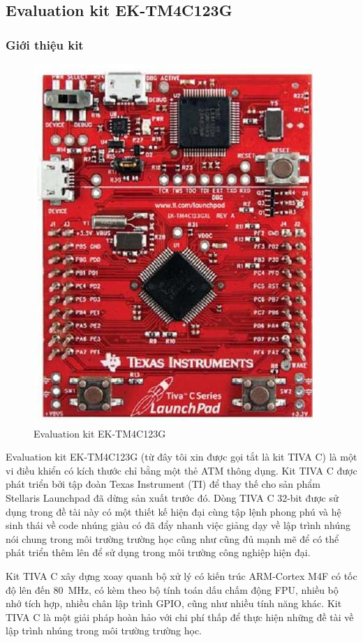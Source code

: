 \subsection{Evaluation kit EK-TM4C123G}
\subsubsection{Giới thiệu kit}
\begin{figure}[ht]
\centering
\includegraphics[scale=0.5]{images/kit_tivac.jpg}
\caption{Evaluation kit EK-TM4C123G}
\end{figure}

Evaluation kit EK-TM4C123G (từ đây tôi xin được gọi tắt là kit TIVA C) là một vi điều khiển có kích thước chỉ bằng một thẻ ATM thông dụng.
Kit TIVA C được phát triển bởi tập đoàn Texas Instrument (TI) để thay thế cho sản phẩm Stellaris Launchpad đã dừng sản xuất trước đó.
Dòng TIVA C 32-bit được sử dụng trong đề tài này có một thiết kế hiện đại cùng tập lệnh phong phú và hệ sinh thái về code nhúng giàu có
đã đẩy nhanh việc giảng dạy về lập trình nhúng nói chung trong môi trường trường học cũng như cũng đủ mạnh mẽ để có thể phát triển thêm lên để sử dụng trong môi trường công nghiệp hiện đại.

Kit TIVA C xây dựng xoay quanh bộ xử lý có kiến trúc ARM-Cortex M4F có tốc độ lên đến \si{80\MHz}, có kèm theo bộ tính toán dấu chấm động FPU, nhiều bộ nhớ tích hợp, nhiều chân lập trình GPIO, cũng như nhiều tính năng khác.
Kit TIVA C là một giải pháp hoàn hảo với chi phí thấp để thực hiện những đề tài về lập trình nhúng trong môi trường trường học.

